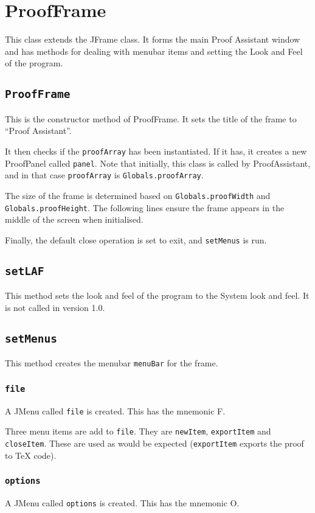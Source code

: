 \documentclass[a4paper]{article}
\begin{document}
\section{ProofFrame}
This class extends the JFrame class. It forms the main Proof Assistant window and has methods for dealing with menubar items and setting the Look and Feel of the program.

\subsection{\texttt{ProofFrame}}
This is the constructor method of ProofFrame. It sets the title of the frame to ``Proof Assistant''. 

It then checks if the \texttt{proofArray} has been instantiated. If it has, it creates a new ProofPanel called \texttt{panel}. Note that initially, this class is called by ProofAssistant, and in that case \texttt{proofArray} is \texttt{Globals.proofArray}.

The size of the frame is determined based on \texttt{Globals.proofWidth} and \texttt{Globals.proofHeight}. The following lines ensure the frame appears in the middle of the screen when initialised.

Finally, the default close operation is set to exit, and \texttt{setMenus} is run.

\subsection{\texttt{setLAF}}
This method sets the look and feel of the program to the System look and feel. It is not called in version 1.0.

\subsection{\texttt{setMenus}}
This method creates the menubar \texttt{menuBar} for the frame.

\subsubsection{\texttt{file}}
A JMenu called \texttt{file} is created. This has the mnemonic F.

Three menu items are add to \texttt{file}. They are \texttt{newItem}, \texttt{exportItem} and \texttt{closeItem}. These are used as would be expected (\texttt{exportItem} exports the proof to TeX code).

\subsubsection{\texttt{options}}
A JMenu called \texttt{options} is created. This has the mnemonic O.
\end{document}
